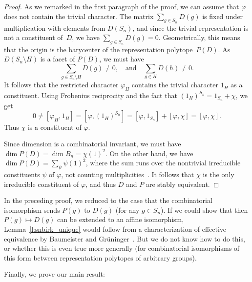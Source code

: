 \documentclass[ALCO,Unicode]{cedram}
\renewcommand{\phi}{\varphi}
\begin{document}
\begin{proof}
    As we remarked in the first paragraph of the proof,
    we can assume that $\phi$ 
    does not contain the trivial character.
    The matrix $\sum_{g\in S_n} D(g)$ is fixed under
    multiplication with elements from $D(S_n)$,
    and since the trivial representation is not a constituent of~$D$,
    we have $\sum_{g\in S_n} D(g) = 0$.
    Geometrically, this means that
    the origin is the barycenter 
    of the representation polytope~$P(D)$.
    As $D(S_n\setminus H)$ is a facet of $P(D)$,
    we must have
      \[ \sum_{g\in S_n \setminus H} D(g) \neq 0
         ,\quad \text{and} \quad 
          \sum_{g\in  H} D(h) \neq 0.
      \]
    It follows that the restricted character
    $\phi_H$ contains the trivial character $1_H$
    as a constituent.
    Using Frobenius reciprocity and the fact that
    $(1_H)^{S_n} = 1_{S_n} + \chi$, we get 
    \[ 0 \neq [\phi_H, 1_H ] = [\phi, (1_H)^{S_n}]
       = [\phi,1_{S_n}] + [\phi,\chi] =  [\phi,\chi].  
    \]
    Thus $\chi$ is a constituent of $\phi$.

  Since dimension is a combinatorial invariant, we must have
  $\dim P(D) = \dim B_n = \chi(1)^2 $.
  On the other hand, we have
  $\dim P(D) = \sum_{\psi} \psi(1)^2$,
  where the sum runs over the nontrivial 
  irreducible constituents $\psi$ of $\phi$,
  not counting multiplicities~\cite[Theorem~3.2]{guralnickperkinson06}.
  It follows that $\chi$ is the only irreducible constituent of $\phi$,
  and thus $D$ and $P$ are stably equivalent.
\end{proof}

\begin{remark}
  In the preceding proof,
  we reduced to the case that the combinatorial isomorphism
  sends $P(g)$ to $D(g)$ (for any $g\in S_n$).
  If we could show that then $P(g)\mapsto D(g)$ 
  can be extended to an affine isomorphism, 
  Lemma~\ref{l:snbirk_unique} would follow
  from a characterization of effective equivalence
  by Baumeister and 
  Grüninger~\cite[Corollary~4.5]{BaumeisterGrueninger15}.
  But we do not know how to do this, or whether this is even true
  more generally 
  (for combinatorial isomorphisms of this form between
  representation polytopes of arbitrary groups).
\end{remark}  



Finally, we prove our main result:
\end{document}
